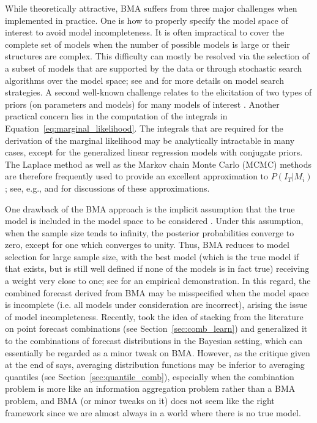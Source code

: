 \documentclass[a4paper,11pt]{article}
\begin{document}
While theoretically attractive, BMA suffers from three major challenges when implemented in practice. One is how to properly specify the model space of interest to avoid model incompleteness. It is often impractical to cover the complete set of models when the number of possible models is large or their structures are complex. This difficulty can mostly be resolved via the selection of a subset of models that are supported by the data or through stochastic search algorithms over the model space; see \citet{Hoeting1999-qn} and \citet{Koop2003-nl} for more details on model search strategies. A second well-known challenge relates to the elicitation of two types of priors (on parameters and models) for many models of interest \citep{Moral-Benito2015-zh,Aastveit2019-lf}. Another practical concern lies in the computation of the integrals in Equation~\eqref{eq:marginal_likelihood}. The integrals that are required for the derivation of the marginal likelihood may be analytically intractable in many cases, except for the generalized linear regression models with conjugate priors. The Laplace method as well as the Markov chain Monte Carlo (MCMC) methods are therefore frequently used to provide an excellent approximation to $P(I_{T}|M_{i})$; see, e.g., \citet{Hoeting1999-qn} and \citet{Bassetti2020-uh} for discussions of these approximations.

One drawback of the BMA approach is the implicit assumption that the true model is included in the model space to be considered \citep{Wright2008-bs}. Under this assumption, when the sample size tends to infinity, the posterior probabilities converge to zero, except for one which converges to unity. Thus, BMA reduces to model selection for large sample size, with the best model (which is the true model if that exists, but is still well defined if none of the models is in fact true) receiving a weight very close to one; see \citet{Geweke2010-zn} for an empirical demonstration. In this regard, the combined forecast derived from BMA may be misspecified when the model space is incomplete (i.e. all models under consideration are incorrect), arising the issue of model incompleteness. Recently, \citet{Yao2018-st} took the idea of stacking from the literature on point forecast combinations (see Section~\ref{sec:comb_learn}) and generalized it to the combinations of forecast distributions in the Bayesian setting, which can essentially be regarded as a minor tweak on BMA. However, as the critique given at the end of \citet{Yao2018-st} says, averaging distribution functions may be inferior to averaging quantiles (see Section~\ref{sec:quantile_comb}), especially when the combination problem is more like an information aggregation problem rather than a BMA problem, and BMA (or minor tweaks on it) does not seem like the right framework since we are almost always in a world where there is no true model.
\end{document}
